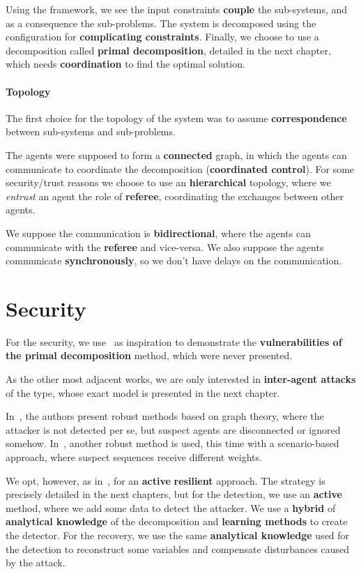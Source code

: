 \documentclass[../main.tex]{subfiles}
\begin{document}
Using the framework, we see the input constraints \textbf{couple} the sub-systems, and as a consequence the sub-problems.
The system is decomposed using the configuration for \textbf{complicating constraints}. Finally, we choose to use a decomposition called \textbf{primal decomposition}, detailed in the next chapter, which needs \textbf{coordination} to find the optimal solution.

\paragraph*{Topology}\label{sec:decomposition_chosen}
The first choice for the topology of the system was to assume \textbf{correspondence} between sub-systems and sub-problems.

The agents were supposed to form a \textbf{connected} graph, in which the agents can communicate to coordinate the decomposition (\textbf{coordinated control}).
For some security/trust reasons we choose to use an \textbf{hierarchical} topology, where we \emph{entrust} an agent the role of \textbf{referee}, coordinating the exchanges between other agents.

We suppose the communication is \textbf{bidirectional}, where the agents can communicate with the \textbf{referee} and vice-versa.
We also suppose the agents communicate \textbf{synchronously}, so we don't have delays on the communication.

\section*{Security}
For the security, we use~\cite{VelardeEtAl2017b,ChanfreutEtAl2018} as inspiration to demonstrate the \textbf{vulnerabilities of the primal decomposition} method, which were never presented.

As the other most adjacent works, we are only interested in \textbf{inter-agent attacks} of the \textbf{\fdi{}} type, whose exact model is presented in the next chapter.

In~\cite{VelardeEtAl2017b,VelardeEtAl2018}, the authors present robust methods based on graph theory, where the attacker is not detected per se, but suspect agents are disconnected or ignored somehow.
In~\cite{VelardeEtAl2017a,MaestreEtAl2021}, another robust method is used, this time with a scenario-based approach, where suspect sequences receive different weights.

We opt, however, as in~\cite{AnandutaEtAl2018,AnandutaEtAl2019,AnandutaEtAl2020},
for an \textbf{active} \textbf{resilient} approach.
The strategy is precisely detailed in the next chapters, but for the detection, we use an \textbf{active} method, where we add some data to detect the attacker.
We use a \textbf{hybrid} of \textbf{analytical knowledge} of the decomposition and \textbf{learning methods} to create the detector.
For the recovery, we use the same \textbf{analytical knowledge} used for the detection to reconstruct some variables and compensate disturbances caused by the attack.
\end{document}
